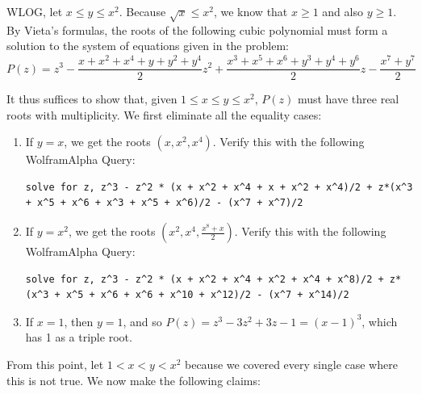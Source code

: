 \documentclass[10pt]{../usamts}
\begin{document}
\begin{solution}

WLOG, let $x \le y \le x^2$. Because $\sqrt{x} \le x^2$, we know that $x \ge 1$ and also $y \ge 1$. By Vieta's formulas, the roots of the following cubic polynomial must form a solution to the system of equations given in the problem:
\[
    P(z) = z^3 - \frac{x + x^2 + x^4 + y + y^2 + y^4}{2}z^2 + \frac{x^3 + x^5 + x^6 + y^3 + y^4 + y^6}{2}z - \frac{x^7 + y^7}{2}
\]

It thus suffices to show that, given $1 \le x \le y \le x^2$, $P(z)$ must have three real roots with multiplicity. We first eliminate all the equality cases:

\begin{enumerate}
\item If $y=x$, we get the roots $(x, x^2, x^4)$. Verify this with the following WolframAlpha Query:
\begin{lstlisting}
solve for z, z^3 - z^2 * (x + x^2 + x^4 + x + x^2 + x^4)/2 + z*(x^3 + x^5 + x^6 + x^3 + x^5 + x^6)/2 - (x^7 + x^7)/2
\end{lstlisting}
    
\item If $y=x^2$, we get the roots $(x^2, x^4, \frac{x^8 + x}{2})$. Verify this with the following WolframAlpha Query:
\begin{lstlisting}
solve for z, z^3 - z^2 * (x + x^2 + x^4 + x^2 + x^4 + x^8)/2 + z*(x^3 + x^5 + x^6 + x^6 + x^10 + x^12)/2 - (x^7 + x^14)/2
\end{lstlisting}

\item If $x=1$, then $y=1$, and so $P(z) = z^3 - 3z^2 + 3z - 1 = (x-1)^3$, which has 1 as a triple root.
\end{enumerate}

From this point, let $1 < x < y < x^2$ because we covered every single case where this is not true. We now make the following claims:


\end{solution}
\end{document}
